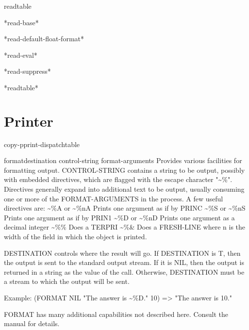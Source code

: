 \begin{class}{readtable}{}{}{}
  
\end{class}

\begin{variable}{*read-base*}{}{}{}
  
\end{variable}

\begin{variable}{*read-default-float-format*}{}{}{}
  
\end{variable}

\begin{variable}{*read-eval*}{}{}{}
  
\end{variable}

\begin{variable}{*read-suppress*}{}{}{}
  
\end{variable}

\begin{variable}{*readtable*}{}{}{}
  
\end{variable}

\section{Printer}

\begin{function}{copy-pprint-dispatch}{\op table}{}{}
  
\end{function}

\begin{function}{format}{destination control-string \rest format-arguments}{}{}
  Provides various facilities for formatting output.
  CONTROL-STRING contains a string to be output, possibly with embedded
  directives, which are flagged with the escape character "\~{}\%". Directives
  generally expand into additional text to be output, usually consuming one
  or more of the FORMAT-ARGUMENTS in the process. A few useful directives
  are:
        \~{}\%A or \~{}\%nA   Prints one argument as if by PRINC
        \~{}\%S or \~{}\%nS   Prints one argument as if by PRIN1
        \~{}\%D or \~{}\%nD   Prints one argument as a decimal integer
        \~{}\%\%          Does a TERPRI
        \~{}\%\&          Does a FRESH-LINE
  where n is the width of the field in which the object is printed.

  DESTINATION controls where the result will go. If DESTINATION is T, then
  the output is sent to the standard output stream. If it is NIL, then the
  output is returned in a string as the value of the call. Otherwise,
  DESTINATION must be a stream to which the output will be sent.

  Example:   (FORMAT NIL "The answer is \~{}\%D." 10) => "The answer is 10."

  FORMAT has many additional capabilities not described here. Consult the
  manual for details.
\end{function}

